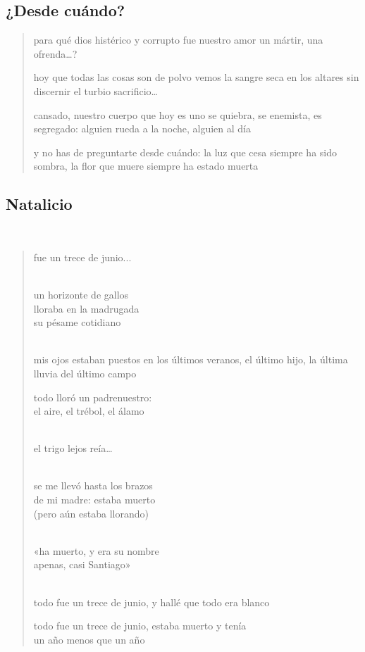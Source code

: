 \documentclass[a4paper, 12pt]{article}
\begin{document}
\pagebreak
\subsection{¿Desde cuándo?}

\begin{verse}

para qué dios histérico y corrupto 
fue nuestro amor un mártir, una ofrenda\ldots?
~ 

hoy que todas las cosas son de polvo 
vemos la sangre seca en los altares
sin discernir el turbio sacrificio\ldots
~ 

cansado, nuestro cuerpo que hoy es uno
se quiebra, se enemista, es segregado:
alguien rueda a la noche, alguien al día
~ 

y no has de preguntarte desde cuándo:
la luz que cesa siempre ha sido sombra,
la flor que muere siempre ha estado muerta

   
\end{verse}

\pagebreak
\subsection{Natalicio}
~ 

\begin{verse}
    
fue un trece de junio...\\
~ 

un horizonte de gallos\\
lloraba en la madrugada\\
su pésame cotidiano\\
~ 

mis ojos estaban puestos
en los últimos veranos,
el último hijo, la última
lluvia del último campo
~

todo lloró un padrenuestro:\\
el aire, el trébol, el álamo\\
~ 

el trigo lejos reía…\\
~ 

se me llevó hasta los brazos\\
de mi madre: estaba muerto\\
(pero aún estaba llorando)\\
~ 

«ha muerto, y era su nombre\\
apenas, casi Santiago»\\
~ 

todo fue un trece de junio,
y hallé que todo era blanco 
~

todo fue un trece de junio,
estaba muerto y tenía\\
un año menos que un año\\
\end{verse}
\end{document}
